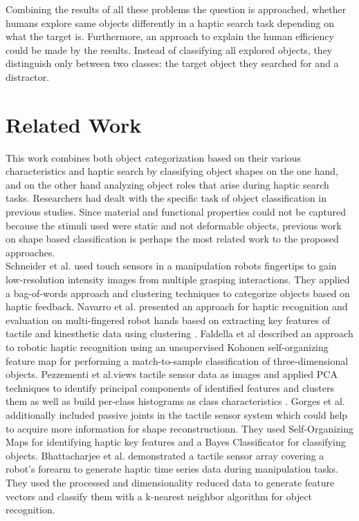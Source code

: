 Combining the results of all these problems the question is approached, whether humans explore same objects differently in a haptic search task depending on what the target is. Furthermore, an approach to explain the human efficiency could be made by the results. Instead of classifying all explored objects, they distinguish only between two classes: the target object they searched for and a distractor.      
\section{Related Work}
This work combines both object categorization based on their various characteristics and haptic search by classifying object shapes on the one hand, and on the other hand analyzing object roles that arise during haptic search tasks. Researchers had dealt with the specific task of object classification in previous studies. Since material and functional properties could not be captured because the stimuli used were static and not deformable objects, previous work on shape based classification is perhaps the most related work to the proposed approaches.\\
Schneider et al. \cite{Schneider} used touch sensors in a manipulation robots fingertips to gain low-resolution intensity images from multiple grasping interactions. They applied a bag-of-words approach and clustering techniques to categorize objects based on haptic feedback. Navarro et al. presented an approach for haptic recognition and evaluation on multi-fingered robot hands based on extracting key features of tactile and kinesthetic data using clustering \cite{Navarro}. Faldella et al \cite{Faldella} described an approach to robotic haptic recognition using an unsupervised Kohonen self-organizing feature map for performing a match-to-sample classification of three-dimensional objects. Pezzementi et al.views tactile sensor data as images and applied PCA techniques to identify principal components of identified features and clusters them as well as build per-class histograms as class characteristics \cite{Pezzementi}. Gorges et al. \cite{Gorges} additionally included passive joints in the tactile sensor system which could help to acquire more information for shape reconstructionn. They used Self-Organizing Maps for identifying haptic key features and a Bayes Classificator for classifying objects. Bhattacharjee et al. \cite{Bhattacharjee} demonstrated a tactile sensor array covering a robot's forearm to generate haptic time series data during manipulation tasks. They used the processed and dimensionality reduced data to generate feature vectors and classify them with a k-nearest neighbor algorithm for object recognition.
